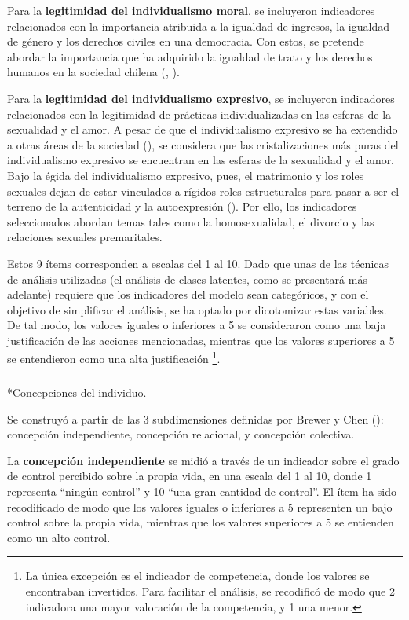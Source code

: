 \documentclass[
  letterpaper,
  DIV=11,
  numbers=noendperiod]{scrartcl}
\makeatletter
\let\oldsubparagraph\subparagraph
\renewcommand{\subparagraph}{
    \@ifstar
      \xxxSubParagraphStar
      \xxxSubParagraphNoStar
  }
\newcommand{\xxxSubParagraphStar}[1]{\oldsubparagraph*{#1}\mbox{}}
\newcommand{\xxxSubParagraphNoStar}[1]{\oldsubparagraph{#1}\mbox{}}
\makeatother
\begin{document}
Para la \textbf{legitimidad del individualismo moral}, se incluyeron
indicadores relacionados con la importancia atribuida a la igualdad de
ingresos, la igualdad de género y los derechos civiles en una
democracia. Con estos, se pretende abordar la importancia que ha
adquirido la igualdad de trato y los derechos humanos en la sociedad
chilena (,
).

Para la \textbf{legitimidad del individualismo expresivo}, se incluyeron
indicadores relacionados con la legitimidad de prácticas
individualizadas en las esferas de la sexualidad y el amor. A pesar de
que el individualismo expresivo se ha extendido a otras áreas de la
sociedad (), se considera que
las cristalizaciones más puras del individualismo expresivo se
encuentran en las esferas de la sexualidad y el amor. Bajo la égida del
individualismo expresivo, pues, el matrimonio y los roles sexuales dejan
de estar vinculados a rígidos roles estructurales para pasar a ser el
terreno de la autenticidad y la autoexpresión
(). Por ello, los indicadores
seleccionados abordan temas tales como la homosexualidad, el divorcio y
las relaciones sexuales premaritales.

Estos 9 ítems corresponden a escalas del 1 al 10. Dado que unas de las
técnicas de análisis utilizadas (el análisis de clases latentes, como se
presentará más adelante) requiere que los indicadores del modelo sean
categóricos, y con el objetivo de simplificar el análisis, se ha optado
por dicotomizar estas variables. De tal modo, los valores iguales o
inferiores a 5 se consideraron como una baja justificación de las
acciones mencionadas, mientras que los valores superiores a 5 se
entendieron como una alta justificación \footnote{La única excepción es
  el indicador de competencia, donde los valores se encontraban
  invertidos. Para facilitar el análisis, se recodificó de modo que 2
  indicadora una mayor valoración de la competencia, y 1 una menor.}.

\subparagraph*{Concepciones del
individuo.}\label{concepciones-del-individuo.}

Se construyó a partir de las 3 subdimensiones definidas por Brewer y
Chen (): concepción independiente,
concepción relacional, y concepción colectiva.

La \textbf{concepción independiente} se midió a través de un indicador
sobre el grado de control percibido sobre la propia vida, en una escala
del 1 al 10, donde 1 representa ``ningún control'' y 10 ``una gran
cantidad de control''. El ítem ha sido recodificado de modo que los
valores iguales o inferiores a 5 representen un bajo control sobre la
propia vida, mientras que los valores superiores a 5 se entienden como
un alto control.
\end{document}
